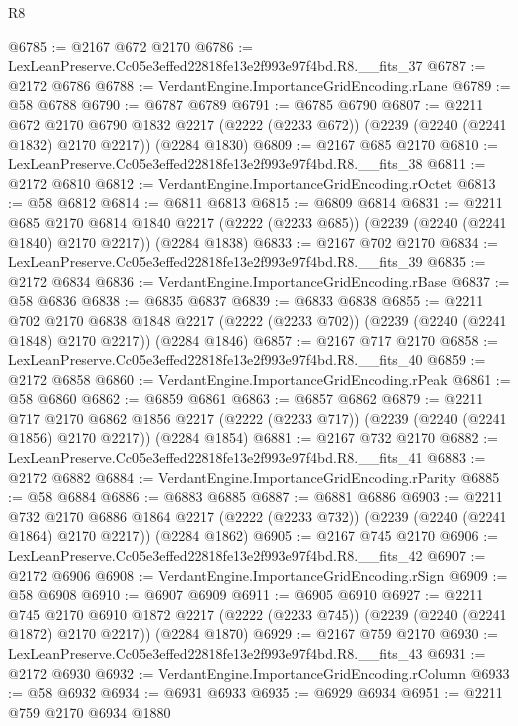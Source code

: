 \begin{lexlean}{R8}
\begin{coremodule}
@6785 := @2167 @672 @2170
@6786 := LexLeanPreserve.Cc05e3effed22818fe13e2f993e97f4bd.R8.__fits_37
@6787 := @2172 @6786
@6788 := VerdantEngine.ImportanceGridEncoding.rLane
@6789 := @58 @6788
@6790 := @6787 @6789
@6791 := @6785 @6790
@6807 := @2211
    @672
    @2170
    @6790
    @1832
    @2217
    (@2222 (@2233 @672))
    (@2239 (@2240 (@2241 @1832) @2170 @2217))
    (@2284 @1830)
@6809 := @2167 @685 @2170
@6810 := LexLeanPreserve.Cc05e3effed22818fe13e2f993e97f4bd.R8.__fits_38
@6811 := @2172 @6810
@6812 := VerdantEngine.ImportanceGridEncoding.rOctet
@6813 := @58 @6812
@6814 := @6811 @6813
@6815 := @6809 @6814
@6831 := @2211
    @685
    @2170
    @6814
    @1840
    @2217
    (@2222 (@2233 @685))
    (@2239 (@2240 (@2241 @1840) @2170 @2217))
    (@2284 @1838)
@6833 := @2167 @702 @2170
@6834 := LexLeanPreserve.Cc05e3effed22818fe13e2f993e97f4bd.R8.__fits_39
@6835 := @2172 @6834
@6836 := VerdantEngine.ImportanceGridEncoding.rBase
@6837 := @58 @6836
@6838 := @6835 @6837
@6839 := @6833 @6838
@6855 := @2211
    @702
    @2170
    @6838
    @1848
    @2217
    (@2222 (@2233 @702))
    (@2239 (@2240 (@2241 @1848) @2170 @2217))
    (@2284 @1846)
@6857 := @2167 @717 @2170
@6858 := LexLeanPreserve.Cc05e3effed22818fe13e2f993e97f4bd.R8.__fits_40
@6859 := @2172 @6858
@6860 := VerdantEngine.ImportanceGridEncoding.rPeak
@6861 := @58 @6860
@6862 := @6859 @6861
@6863 := @6857 @6862
@6879 := @2211
    @717
    @2170
    @6862
    @1856
    @2217
    (@2222 (@2233 @717))
    (@2239 (@2240 (@2241 @1856) @2170 @2217))
    (@2284 @1854)
@6881 := @2167 @732 @2170
@6882 := LexLeanPreserve.Cc05e3effed22818fe13e2f993e97f4bd.R8.__fits_41
@6883 := @2172 @6882
@6884 := VerdantEngine.ImportanceGridEncoding.rParity
@6885 := @58 @6884
@6886 := @6883 @6885
@6887 := @6881 @6886
@6903 := @2211
    @732
    @2170
    @6886
    @1864
    @2217
    (@2222 (@2233 @732))
    (@2239 (@2240 (@2241 @1864) @2170 @2217))
    (@2284 @1862)
@6905 := @2167 @745 @2170
@6906 := LexLeanPreserve.Cc05e3effed22818fe13e2f993e97f4bd.R8.__fits_42
@6907 := @2172 @6906
@6908 := VerdantEngine.ImportanceGridEncoding.rSign
@6909 := @58 @6908
@6910 := @6907 @6909
@6911 := @6905 @6910
@6927 := @2211
    @745
    @2170
    @6910
    @1872
    @2217
    (@2222 (@2233 @745))
    (@2239 (@2240 (@2241 @1872) @2170 @2217))
    (@2284 @1870)
@6929 := @2167 @759 @2170
@6930 := LexLeanPreserve.Cc05e3effed22818fe13e2f993e97f4bd.R8.__fits_43
@6931 := @2172 @6930
@6932 := VerdantEngine.ImportanceGridEncoding.rColumn
@6933 := @58 @6932
@6934 := @6931 @6933
@6935 := @6929 @6934
@6951 := @2211
    @759
    @2170
    @6934
    @1880

\end{coremodule}
\end{lexlean}
